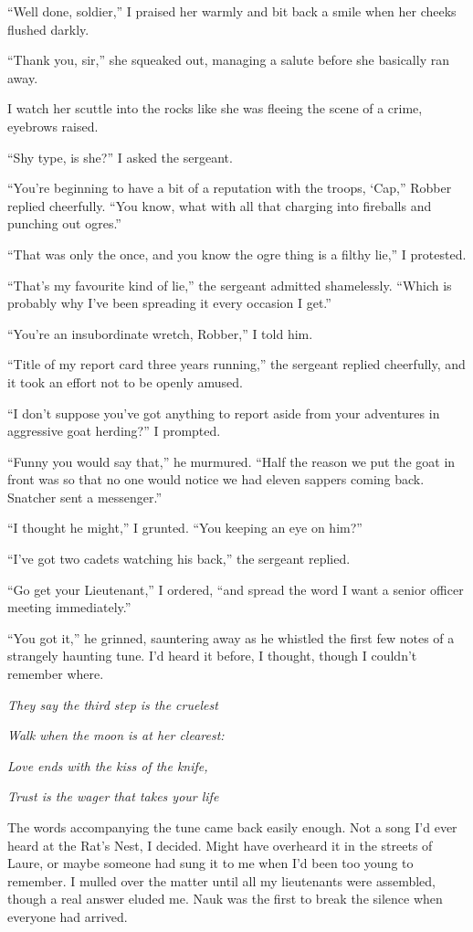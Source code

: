 \documentclass[12pt, openany]{book}
\begin{document}
“Well done, soldier,” I praised her warmly and bit back a smile when her cheeks flushed darkly.

“Thank you, sir,” she squeaked out, managing a salute before she basically ran away.

I watch her scuttle into the rocks like she was fleeing the scene of a crime, eyebrows raised.

“Shy type, is she?” I asked the sergeant.

“You’re beginning to have a bit of a reputation with the troops, ‘Cap,” Robber replied cheerfully. “You know, what with all that charging into fireballs and punching out ogres.”

“That was only the once, and you know the ogre thing is a filthy lie,” I protested.

“That’s my favourite kind of lie,” the sergeant admitted shamelessly. “Which is probably why I’ve been spreading it every occasion I get.”

“You’re an insubordinate wretch, Robber,” I told him.

“Title of my report card three years running,” the sergeant replied cheerfully, and it took an effort not to be openly amused.

“I don’t suppose you’ve got anything to report aside from your adventures in aggressive goat herding?” I prompted.

“Funny you would say that,” he murmured. “Half the reason we put the goat in front was so that no one would notice we had eleven sappers coming back. Snatcher sent a messenger.”

“I thought he might,” I grunted. “You keeping an eye on him?”

“I’ve got two cadets watching his back,” the sergeant replied. 

“Go get your Lieutenant,” I ordered, “and spread the word I want a senior officer meeting immediately.”

“You got it,” he grinned, sauntering away as he whistled the first few notes of a strangely haunting tune. I’d heard it before, I thought, though I couldn’t remember where.

\textit{They say the third step is the cruelest}

\textit{Walk when the moon is at her clearest:}

\textit{Love ends with the kiss of the knife,}

\textit{Trust is the wager that takes your life}

The words accompanying the tune came back easily enough. Not a song I’d ever heard at the Rat’s Nest, I decided. Might have overheard it in the streets of Laure, or maybe someone had sung it to me when I’d been too young to remember. I mulled over the matter until all my lieutenants were assembled, though a real answer eluded me. Nauk was the first to break the silence when everyone had arrived.
\end{document}
